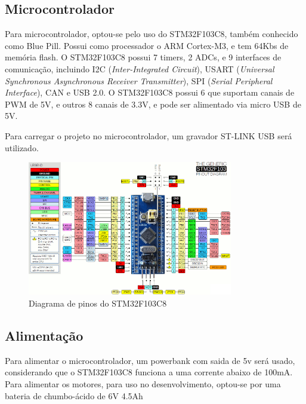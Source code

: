 \subsection{Microcontrolador}

Para microcontrolador, optou-se pelo uso do  STM32F103C8, também conhecido como Blue Pill.
Possui como processador o ARM Cortex-M3, e tem 64Kbs de memória flash. 
O STM32F103C8 possui 7 timers, 2 ADCs, e 9 interfaces de comunicação, incluindo
I2C (\textit{Inter-Integrated Circuit}), USART (\textit{Universal Synchronous
Asynchronous Receiver Transmitter}), SPI (\textit{Serial Peripheral Interface}),
CAN e USB 2.0.
O STM32F103C8 possui 6 que suportam canais de PWM de 5V, e outros 8 canais de 3.3V,  e pode ser alimentado via micro
USB de 5V.

Para carregar o projeto no microcontrolador, um gravador ST-LINK USB será utilizado.

\begin{figure}[h]
	\centering
	\includegraphics[width=0.8\textwidth]{figures/stm32f1_pinout}
	\caption{Diagrama de pinos do STM32F103C8}
\end{figure}

\subsection{Alimentação}
Para alimentar o microcontrolador, um powerbank com saida de 5v será usado, considerando que o STM32F103C8 funciona a
uma corrente abaixo de 100mA. Para alimentar os motores, para uso no desenvolvimento, optou-se por uma bateria de chumbo-ácido de 6V 4.5Ah



